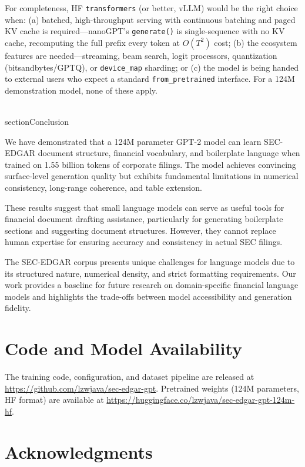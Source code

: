 \documentclass[12pt]{article}
\begin{document}
For completeness, HF \texttt{transformers} (or better, vLLM) would be the right choice when: (a) batched, high-throughput serving with continuous batching and paged KV cache is required---nanoGPT's \texttt{generate()} is single-sequence with no KV cache, recomputing the full prefix every token at $O(T^2)$ cost; (b) the ecosystem features are needed---streaming, beam search, logit processors, quantization (bitsandbytes/GPTQ), or \texttt{device\_map} sharding; or (c) the model is being handed to external users who expect a standard \texttt{from\_pretrained} interface. For a 124M demonstration model, none of these apply.

\\section{Conclusion}

We have demonstrated that a 124M parameter GPT-2 model can learn SEC-EDGAR document structure, financial vocabulary, and boilerplate language when trained on 1.55 billion tokens of corporate filings. The model achieves convincing surface-level generation quality but exhibits fundamental limitations in numerical consistency, long-range coherence, and table extension.

These results suggest that small language models can serve as useful tools for financial document drafting assistance, particularly for generating boilerplate sections and suggesting document structures. However, they cannot replace human expertise for ensuring accuracy and consistency in actual SEC filings.

The SEC-EDGAR corpus presents unique challenges for language models due to its structured nature, numerical density, and strict formatting requirements. Our work provides a baseline for future research on domain-specific financial language models and highlights the trade-offs between model accessibility and generation fidelity.

\section{Code and Model Availability}
The training code, configuration, and dataset pipeline are released at
\url{https://github.com/lzwjava/sec-edgar-gpt}. Pretrained weights
(124M parameters, HF format) are available at
\url{https://huggingface.co/lzwjava/sec-edgar-gpt-124m-hf}.

\section*{Acknowledgments}
\end{document}
